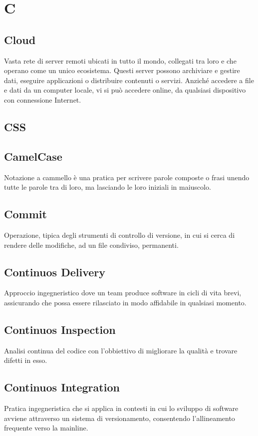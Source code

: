 \section*{C}

\subsection{Cloud}
Vasta rete di server remoti ubicati in tutto il mondo, collegati tra loro e che operano come un unico ecosistema. Questi server possono archiviare e gestire dati, eseguire applicazioni o distribuire contenuti o servizi. Anziché accedere a file e dati da un computer locale, vi si può accedere online, da qualsiasi dispositivo con connessione Internet.

\subsection{CSS}

\subsection{CamelCase}
Notazione a cammello è una pratica per scrivere parole composte o frasi unendo tutte le parole tra di loro, ma lasciando 
le loro iniziali in maiuscolo. 

\subsection{Commit}
Operazione, tipica degli strumenti di controllo di versione, in cui si cerca di rendere delle modifiche, ad un file condiviso, permanenti.

\subsection{Continuos Delivery}
Approccio ingegneristico dove un team produce software in cicli di vita brevi, assicurando che possa essere rilasciato in modo 
affidabile in qualsiasi momento. 

\subsection{Continuos Inspection}
Analisi continua del codice con l'obbiettivo di migliorare la qualità e trovare difetti in esso. 

\subsection{Continuos Integration}
Pratica ingegneristica che si applica in contesti in cui lo sviluppo di software avviene attraverso un sistema di versionamento, 
consentendo l'allineamento frequente verso la mainline.  

